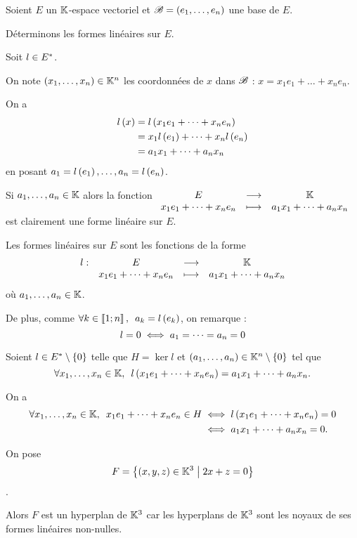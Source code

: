 \begin{rem}
Soient \(E\) un \(\mathbb{K}\)-espace vectoriel et \(\mathscr{B}=\left(e_1,\dots,e_n\right)\) une base de \(E\).

Déterminons les formes linéaires sur \(E\).

\analyse

Soit \(l\in E^{*}\).

On note \(\left(x_1,\dots,x_n\right)\in\mathbb{K}^n\) les coordonnées de \(x\) dans \(\mathscr{B}\) : \(x=x_1e_1+\dots+x_ne_n\).

On a \[\begin{aligned}
l\left(x\right)&=l\left(x_1e_1+\dots+x_ne_n\right) \\
&=x_1l\left(e_1\right)+\dots+x_nl\left(e_n\right) \\
&=a_1x_1+\dots+a_nx_n
\end{aligned}\] en posant \(a_1=l\left(e_1\right),\dots,a_n=l\left(e_n\right)\).

\synthese

Si \(a_1,\dots,a_n\in\mathbb{K}\) alors la fonction \(\begin{array}[t]{ccc}E & \longrightarrow & \mathbb{K} \\ x_1e_1+\dots+x_ne_n & \longmapsto & a_1x_1+\dots+a_nx_n\end{array}\) est clairement une forme linéaire sur \(E\).

\conclusion

Les formes linéaires sur \(E\) sont les fonctions de la forme \[\begin{array}[t]{cccc}l : & E & \longrightarrow & \mathbb{K} \\ & x_1e_1+\dots+x_ne_n & \longmapsto & a_1x_1+\dots+a_nx_n\end{array}\] où \(a_1,\dots,a_n\in\mathbb{K}\).

De plus, comme \(\quantifs{\forall k\in\interventierii{1}{n}}a_k=l\paren{e_k}\), on remarque : \[l=0\iff a_1=\dots=a_n=0\]
\end{rem}

\begin{dem}
Soient \(l\in E^{*}\setminus\left\lbrace0\right\rbrace\) telle que \(H=\ker l\) et \(\left(a_1,\dots,a_n\right)\in\mathbb{K}^n\setminus\left\lbrace0\right\rbrace\) tel que \[\quantifs{\forall x_1,\dots,x_n\in\K}l\paren{x_1e_1+\dots+x_ne_n}=a_1x_1+\dots+a_nx_n.\]

On a \[\begin{aligned}
\quantifs{\forall x_1,\dots,x_n\in\K}x_1e_1+\dots+x_ne_n\in H&\ssi l\paren{x_1e_1+\dots+x_ne_n}=0 \\
&\ssi a_1x_1+\dots+a_nx_n=0.
\end{aligned}\]
\end{dem}

\begin{ex}
On pose \[F=\left\lbrace\left(x,y,z\right)\in\mathbb{K}^3\;\middle|\;2x+z=0\right\rbrace\].

Alors \(F\) est un hyperplan de \(\mathbb{K}^3\) car les hyperplans de \(\mathbb{K}^3\) sont les noyaux de ses formes linéaires non-nulles.
\end{ex}

